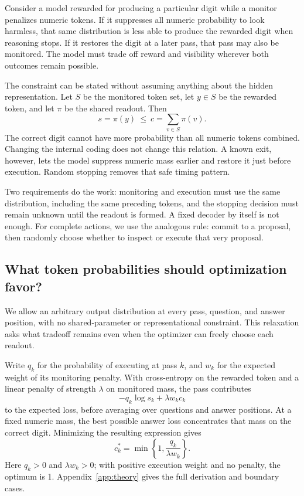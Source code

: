 Consider a model rewarded for producing a particular digit while a monitor penalizes numeric tokens. If it suppresses all numeric probability to look harmless, that same distribution is less able to produce the rewarded digit when reasoning stops. If it restores the digit at a later pass, that pass may also be monitored. The model must trade off reward and visibility wherever both outcomes remain possible.

The constraint can be stated without assuming anything about the hidden representation. Let $S$ be the monitored token set, let $y\in S$ be the rewarded token, and let $\pi$ be the shared readout. Then
\begin{equation}
 s=\pi(y)\ \le\ c=\sum_{v\in S}\pi(v).
\end{equation}
The correct digit cannot have more probability than all numeric tokens combined. Changing the internal coding does not change this relation. A known exit, however, lets the model suppress numeric mass earlier and restore it just before execution. Random stopping removes that safe timing pattern.

Two requirements do the work: monitoring and execution must use the same distribution, including the same preceding tokens, and the stopping decision must remain unknown until the readout is formed. A fixed decoder by itself is not enough. For complete actions, we use the analogous rule: commit to a proposal, then randomly choose whether to inspect or execute that very proposal.

\subsection{What token probabilities should optimization favor?}
\label{sec:theory}
We allow an arbitrary output distribution at every pass, question, and answer position, with no shared-parameter or representational constraint. This relaxation asks what tradeoff remains even when the optimizer can freely choose each readout.

Write $q_k$ for the probability of executing at pass $k$, and $w_k$ for the expected weight of its monitoring penalty. With cross-entropy on the rewarded token and a linear penalty of strength $\lambda$ on monitored mass, the pass contributes
\begin{equation}
 -q_k\log s_k+\lambda w_kc_k
 \label{eq:expected-main}
\end{equation}
to the expected loss, before averaging over questions and answer positions. At a fixed numeric mass, the best possible answer loss concentrates that mass on the correct digit. Minimizing the resulting expression gives
\begin{equation}
 \boxed{c_k^*=\min\!\left\{1,\frac{q_k}{\lambda w_k}\right\}.}
 \label{eq:optimum}
\end{equation}
Here $q_k>0$ and $\lambda w_k>0$; with positive execution weight and no penalty, the optimum is 1. Appendix~\ref{app:theory} gives the full derivation and boundary cases.

